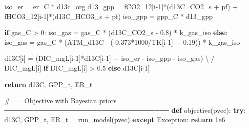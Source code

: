 \documentclass[
  letterpaper,
  DIV=11,
  numbers=noendperiod]{scrartcl}
\newenvironment{Shaded}{\begin{snugshade}}{\end{snugshade}}
\newcommand{\CommentTok}[1]{\textcolor[rgb]{0.37,0.37,0.37}{#1}}
\newcommand{\ControlFlowTok}[1]{\textcolor[rgb]{0.00,0.23,0.31}{\textbf{#1}}}
\newcommand{\DecValTok}[1]{\textcolor[rgb]{0.68,0.00,0.00}{#1}}
\newcommand{\FloatTok}[1]{\textcolor[rgb]{0.68,0.00,0.00}{#1}}
\newcommand{\KeywordTok}[1]{\textcolor[rgb]{0.00,0.23,0.31}{\textbf{#1}}}
\newcommand{\NormalTok}[1]{\textcolor[rgb]{0.00,0.23,0.31}{#1}}
\newcommand{\OperatorTok}[1]{\textcolor[rgb]{0.37,0.37,0.37}{#1}}
\newcommand{\PreprocessorTok}[1]{\textcolor[rgb]{0.68,0.00,0.00}{#1}}
\begin{document}
\begin{Shaded}
\begin{Highlighting}[]
\NormalTok{        iso\_er  }\OperatorTok{=}\NormalTok{ er\_C }\OperatorTok{*}\NormalTok{ d13c\_org}
\NormalTok{        d13\_gpp }\OperatorTok{=}\NormalTok{ fCO2\_12[i}\OperatorTok{{-}}\DecValTok{1}\NormalTok{]}\OperatorTok{*}\NormalTok{(d13C\_CO2\_s }\OperatorTok{+}\NormalTok{ pf) }\OperatorTok{+}\NormalTok{ fHCO3\_12[i}\OperatorTok{{-}}\DecValTok{1}\NormalTok{]}\OperatorTok{*}\NormalTok{(d13C\_HCO3\_s }\OperatorTok{+}\NormalTok{ pf)}
\NormalTok{        iso\_gpp }\OperatorTok{=}\NormalTok{ gpp\_C }\OperatorTok{*}\NormalTok{ d13\_gpp}

        \ControlFlowTok{if}\NormalTok{ gas\_C }\OperatorTok{\textgreater{}} \DecValTok{0}\NormalTok{:}
\NormalTok{            iso\_gas }\OperatorTok{=}\NormalTok{ gas\_C }\OperatorTok{*}\NormalTok{ (d13C\_CO2\_s }\OperatorTok{{-}} \FloatTok{0.8}\NormalTok{) }\OperatorTok{*}\NormalTok{ k\_gas\_iso}
        \ControlFlowTok{else}\NormalTok{:}
\NormalTok{            iso\_gas }\OperatorTok{=}\NormalTok{ gas\_C }\OperatorTok{*}\NormalTok{ (ATM\_d13C }\OperatorTok{{-}}\NormalTok{ (}\OperatorTok{{-}}\FloatTok{0.373}\OperatorTok{*}\DecValTok{1000}\OperatorTok{/}\NormalTok{TK[i}\OperatorTok{{-}}\DecValTok{1}\NormalTok{] }\OperatorTok{+} \FloatTok{0.19}\NormalTok{)) }\OperatorTok{*}\NormalTok{ k\_gas\_iso}

\NormalTok{        d13C[i] }\OperatorTok{=}\NormalTok{ (DIC\_mgL[i}\OperatorTok{{-}}\DecValTok{1}\NormalTok{]}\OperatorTok{*}\NormalTok{d13C[i}\OperatorTok{{-}}\DecValTok{1}\NormalTok{] }\OperatorTok{+}\NormalTok{ iso\_er }\OperatorTok{{-}}\NormalTok{ iso\_gpp }\OperatorTok{{-}}\NormalTok{ iso\_gas) }\OperatorTok{\textbackslash{}}
                   \OperatorTok{/}\NormalTok{ DIC\_mgL[i] }\ControlFlowTok{if}\NormalTok{ DIC\_mgL[i] }\OperatorTok{\textgreater{}} \FloatTok{0.5} \ControlFlowTok{else}\NormalTok{ d13C[i}\OperatorTok{{-}}\DecValTok{1}\NormalTok{]}

    \ControlFlowTok{return}\NormalTok{ d13C, GPP\_t, ER\_t}

\CommentTok{\# ── Objective with Bayesian priors ──────────────────────────────────}
\KeywordTok{def}\NormalTok{ objective(pvec):}
    \ControlFlowTok{try}\NormalTok{:}
\NormalTok{        d13C, GPP\_t, ER\_t }\OperatorTok{=}\NormalTok{ run\_model(pvec)}
    \ControlFlowTok{except} \PreprocessorTok{Exception}\NormalTok{:}
        \ControlFlowTok{return} \FloatTok{1e6}


\end{Highlighting}
\end{Shaded}
\end{document}
